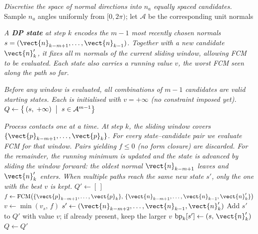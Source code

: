
\begin{algorithm}
\caption{DP path planner — basic, annotated (maximises PFCM)}
\label{alg:dp-basic-annotated}
\begin{algorithmic}

\Statex \textit{Discretise the space of normal directions into $n_a$ equally spaced candidates.}
\State Sample $n_a$ angles uniformly from $[0,2\pi)$; let $\mathcal{A}$ be the corresponding unit normals

\Statex
\Statex \textit{A \textbf{DP state} at step $k$ encodes the $m{-}1$ most recently chosen normals}
\Statex \textit{$s=(\vect{n}_{k-m+1},\ldots,\vect{n}_{k-1})$. Together with a new candidate $\vect{n}'_k$, it fixes all}
\Statex \textit{$m$ normals of the current sliding window, allowing FCM to be evaluated.}
\Statex \textit{Each state also carries a running value $v$, the worst FCM seen along the path so far.}

\Statex
\Statex \textit{Before any window is evaluated, all combinations of $m{-}1$ candidates are valid}
\Statex \textit{starting states. Each is initialised with $v=+\infty$ (no constraint imposed yet).}
\State $Q \gets \bigl\{\,(s,\;+\infty)\;\bigm|\;s\in\mathcal{A}^{m-1}\bigr\}$

\Statex
\Statex \textit{Process contacts one at a time. At step $k$, the sliding window covers}
\Statex \textit{$\{\vect{p}_{k-m+1},\ldots,\vect{p}_k\}$. For every state–candidate pair we evaluate FCM for}
\Statex \textit{that window. Pairs yielding $f\leq 0$ (no form closure) are discarded. For the}
\Statex \textit{remainder, the running minimum is updated and the state is advanced by sliding}
\Statex \textit{the window forward: the oldest normal $\vect{n}_{k-m+1}$ leaves and $\vect{n}'_k$ enters.}
\Statex \textit{When multiple paths reach the same new state $s'$, only the one with the best $v$ is kept.}
  \State $Q'\gets[\,]$
     
      \State $f\gets\mathrm{FCM}\!\left(\{\vect{p}_{k-m+1},\ldots,\vect{p}_k\},\,\{\vect{n}_{k-m+1},\ldots,\vect{n}_{k-1},\vect{n}'_k\}\right)$
        \State $v\gets\min(v_s,\,f)$
        \State $s'\gets(\vect{n}_{k-m+2},\ldots,\vect{n}_{k-1},\vect{n}'_k)$
        \State Add $s'$ to $Q'$ with value $v$; if already present, keep the larger $v$
        \State $\mathrm{bp}_k[s'] \gets (s,\,\vect{n}'_k)$ 
      \EndIf
    \EndFor
  \EndFor
  \State $Q\gets Q'$
\EndFor


\end{algorithmic}
\end{algorithm}
